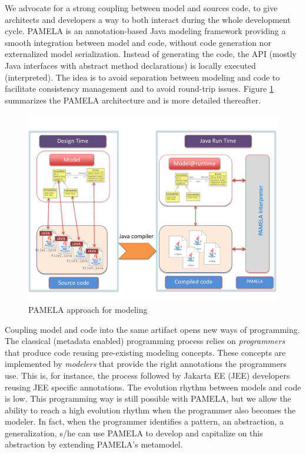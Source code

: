 We advocate for a strong coupling between model and sources code, to give architects and developers a way to both interact during the whole development cycle. PAMELA is an annotation-based Java modeling framework providing a smooth integration between model and code, without code generation nor externalized model serialization. Instead of generating the code, the API (mostly Java interfaces with abstract method declarations) is locally executed (interpreted). The idea is to avoid separation between modeling and code to facilitate consistency management and to avoid round-trip issues. Figure \ref{fig:PamelaVision} summarizes the PAMELA architecture and is more detailed thereafter.  

\begin{figure}
    \centering
    \includegraphics[width=1.0 \columnwidth]{PamelaVisionV2.pdf}
    \caption{PAMELA approach for modeling}
    \label{fig:PamelaVision}
\end{figure}


Coupling model and code into the same artifact opens new ways of programming. The classical (metadata enabled) programming process relies on \emph{programmers} that produce code reusing pre-existing modeling concepts. These concepts are implemented by \emph{modelers} that provide the right annotations the programmers use. This is, for instance, the process followed by Jakarta EE (JEE) developers reusing JEE specific annotations. The evolution rhythm between models and code is low. This programming way is still possible with PAMELA, but we allow the ability to reach a high evolution rhythm when the programmer also becomes the modeler. In fact, when the programmer identifies a pattern, an abstraction, a generalization, s/he can use PAMELA to develop and capitalize on this abstraction by extending PAMELA's metamodel. 

